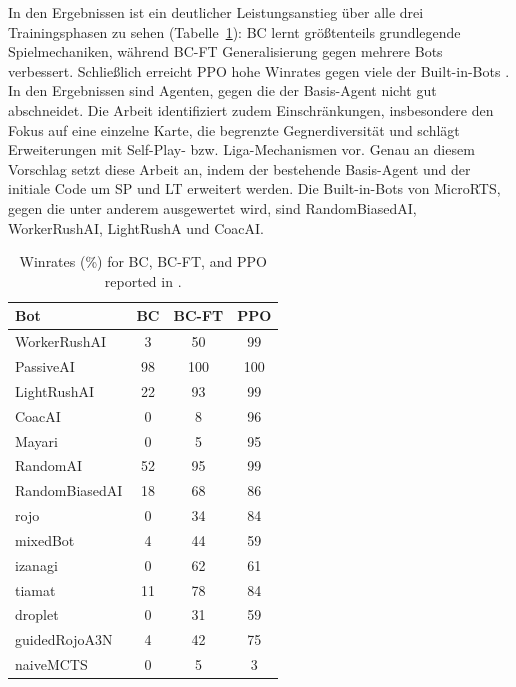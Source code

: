 \documentclass[10pt,twocolumn,letterpaper]{article}
\begin{document}
In den Ergebnissen ist ein deutlicher Leistungsanstieg über alle drei Trainingsphasen zu sehen (Tabelle~\ref{tab:winrates_all}): BC lernt größtenteils grundlegende Spielmechaniken, während BC-FT Generalisierung gegen mehrere Bots verbessert. 
Schließlich erreicht PPO hohe Winrates gegen viele der Built-in-Bots \cite{huft2023microrts}. 
In den Ergebnissen sind Agenten, gegen die der Basis-Agent nicht gut abschneidet. Die Arbeit identifiziert zudem Einschränkungen, insbesondere den Fokus auf eine einzelne Karte, die begrenzte Gegnerdiversität und schlägt Erweiterungen mit Self-Play- bzw. Liga-Mechanismen vor. 
Genau an diesem Vorschlag setzt diese Arbeit an, indem der bestehende Basis-Agent und der initiale Code um SP und LT erweitert werden.
Die Built-in-Bots von MicroRTS, gegen die unter anderem ausgewertet wird, sind RandomBiasedAI, WorkerRushAI, LightRushA und CoacAI.
\begin{table}[ht]
\centering
\caption{Winrates (\%) for BC, BC-FT, and PPO reported in \cite{huft2023microrts}.}
\label{tab:winrates_all}
\begin{tabular}{lccc}
\hline
\textbf{Bot} & \textbf{BC} & \textbf{BC-FT} & \textbf{PPO} \\
\hline
WorkerRushAI     & 3 & 50 & 99 \\
PassiveAI        & 98& 100& 100 \\
LightRushAI      & 22 & 93 & 99 \\
CoacAI           & 0 & 8 & 96 \\
Mayari           & 0 & 5 & 95 \\
RandomAI         & 52 & 95 & 99\\
RandomBiasedAI   & 18 & 68 & 86\\
rojo             & 0 & 34& 84 \\
mixedBot         & 4 & 44 & 59 \\
izanagi          & 0& 62& 61\\
tiamat           & 11 & 78& 84 \\
droplet          & 0& 31& 59\\
guidedRojoA3N    & 4 & 42& 75 \\
naiveMCTS        & 0 & 5& 3 \\
\hline
\end{tabular}
\end{table}
\vspace{10pt}
\end{document}
